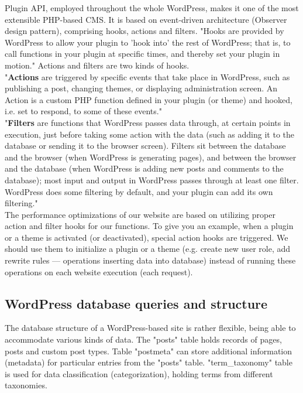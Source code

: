 Plugin API, employed throughout the whole WordPress, makes it one of the most extensible PHP-based CMS. It is based on event-driven architecture (Observer design pattern), comprising hooks, actions and filters. "Hooks are provided by WordPress to allow your plugin to 'hook into' the rest of WordPress; that is, to call functions in your plugin at specific times, and thereby set your plugin in motion." \cite{WP:Plugin-API} Actions and filters are two kinds of hooks. \\

"\textbf{Actions} are triggered by specific events that take place in WordPress, such as publishing a post, changing themes, or displaying administration screen. An Action is a custom PHP function defined in your plugin (or theme) and hooked, i.e. set to respond, to some of these events." \\

"\textbf{Filters} are functions that WordPress passes data through, at certain points in execution, just before taking some action with the data (such as adding it to the database or sending it to the browser screen). Filters sit between the database and the browser (when WordPress is generating pages), and between the browser and the database (when WordPress is adding new posts and comments to the database); most input and output in WordPress passes through at least one filter. WordPress does some filtering by default, and your plugin can add its own filtering." \\

The performance optimizations of our website are based on utilizing proper action and filter hooks for our functions. To give you an example, when a plugin or a theme is activated (or deactivated), special action hooks are triggered. We should use them to initialize a plugin or a theme (e.g. create new user role, add rewrite rules — operations inserting data into database) instead of running these operations on each website execution (each request).

\subsection{WordPress database queries and structure}

The database structure of a WordPress-based site is rather flexible, being able to accommodate various kinds of data. The "posts" table holds records of pages, posts and custom post types. \cite{WP:Post-Types} Table "postmeta" can store additional information (metadata) for particular entries from the "posts" table. "term\_taxonomy" table is used for data classification (categorization), holding terms from different taxonomies. \cite{WP:Taxonomies} \\

